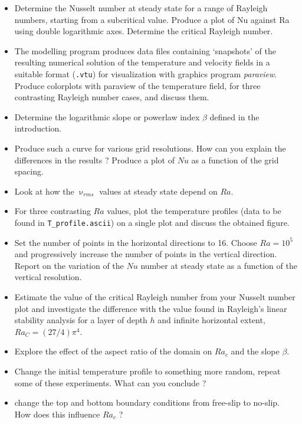 \begin{itemize}
\item Determine the Nusselt number at steady state for a range of Rayleigh numbers, 
starting from a subcritical value. 
Produce a plot of Nu against Ra using double logarithmic axes. Determine the critical Rayleigh number. 

\item The modelling program produces data files containing ‘snapshots’ of the resulting numerical solution 
of the temperature and velocity fields in a suitable format ({\tt .vtu}) for visualization with graphics program {\sl paraview}. 
Produce colorplots with paraview of the temperature field, for three contrasting Rayleigh number cases, and discuss them.

\item Determine the logarithmic slope or powerlaw index $\beta$ defined in the introduction.

\item Produce such a curve for various grid resolutions. How can you explain the differences in the results ? Produce a plot 
of $Nu$ as a function of the grid spacing. 

\item Look at how the $\upnu_{rms}$ values at steady state depend on $Ra$. 

\item For three contrasting $Ra$ values, plot the temperature profiles (data to be found in {\tt T\_profile.ascii}) 
on a single plot and discuss the obtained figure.

\item Set the number of points in the horizontal directions to 16. Choose $Ra=10^5$ and progressively increase the number 
of points in the vertical direction. Report on the variation of the $Nu$ number at steady state as a function of the vertical
resolution.

\item Estimate the value of the critical Rayleigh number from your Nusselt number plot and investigate the 
difference with the value found in Rayleigh's linear stability analysis for a layer of depth $h$ and infinite horizontal extent, 
$Ra_C = (27/4)  \pi^4$.

\item Explore the effect of the aspect ratio of the domain on $Ra_c$ and the slope $\beta$.

\item Change the initial temperature profile to something more random, repeat some of these experiments. What can you conclude ?

\item change the top and bottom boundary conditions from free-slip to no-slip. How does this influence $Ra_c$ ?

\end{itemize}


